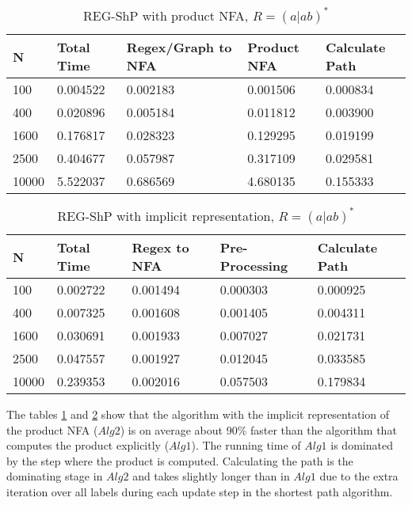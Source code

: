 \documentclass[]{article}
\numberwithin{equation}{section}
\begin{document}
\begin{table}[H]
	\centering
	\begin{tabular}{|l|l|l|l|l|}
		\hline
		N     & Total Time & Regex/Graph to NFA & Product NFA & Calculate Path \\ \hline
		100   & 0.004522   & 0.002183           & 0.001506    & 0.000834       \\ \hline
		400   & 0.020896   & 0.005184           & 0.011812    & 0.003900       \\ \hline
		1600  & 0.176817   & 0.028323           & 0.129295    & 0.019199       \\ \hline
		2500  & 0.404677   & 0.057987           & 0.317109    & 0.029581       \\ \hline
		10000 & 5.522037   & 0.686569           & 4.680135    & 0.155333       \\ \hline
	\end{tabular}
	\caption{REG-ShP with product NFA, $R = (a|ab)^*$}
	\label{table:regshpproduct}
\end{table}

\begin{table}[H]
	\centering
	\begin{tabular}{|l|l|l|l|l|}
		\hline
		N     & Total Time & Regex to NFA & Pre-Processing & Calculate Path \\ \hline
		100   & 0.002722   & 0.001494     & 0.000303       & 0.000925       \\ \hline
		400   & 0.007325   & 0.001608     & 0.001405       & 0.004311       \\ \hline
		1600  & 0.030691   & 0.001933     & 0.007027       & 0.021731       \\ \hline
		2500  & 0.047557   & 0.001927     & 0.012045       & 0.033585       \\ \hline
		10000 & 0.239353   & 0.002016     & 0.057503       & 0.179834       \\ \hline
	\end{tabular}
	\caption{REG-ShP with implicit representation, $R = (a|ab)^*$}
	\label{table:regshp}
\end{table}

The tables \ref{table:regshpproduct} and \ref{table:regshp} show that  the algorithm with the implicit representation of the product NFA ($Alg2$) is on average about 90\% faster than the algorithm that computes the product explicitly ($Alg1$). The running time of $Alg1$ is dominated by the step where the product is computed. Calculating the path is the dominating stage in $Alg2$ and takes slightly longer than in $Alg1$ due to the extra iteration over all labels during each update step in the shortest path algorithm.
\end{document}
